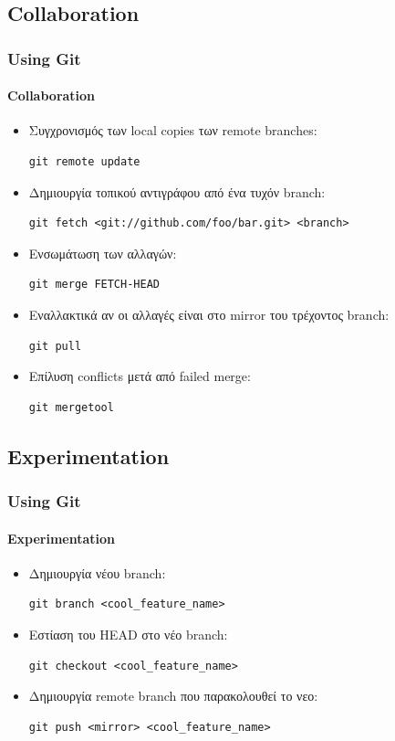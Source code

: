 \documentclass[]{beamer}
\begin{document}
\subsection{Collaboration}

\begin{frame}[fragile]
  \frametitle{Using Git}
  \framesubtitle{Collaboration}
  \begin{itemize}
    \item Συγχρονισμός των local copies των remote branches:
\begin{verbatim}
git remote update
\end{verbatim}
    \item Δημιουργία τοπικού αντιγράφου από ένα τυχόν branch:
\begin{verbatim}
git fetch <git://github.com/foo/bar.git> <branch>
\end{verbatim}
    \item Ενσωμάτωση των αλλαγών:
\begin{verbatim}
git merge FETCH-HEAD
\end{verbatim}
    \item Εναλλακτικά αν οι αλλαγές είναι στο mirror του τρέχοντος branch:
\begin{verbatim}
git pull
\end{verbatim}
    \item Επίλυση conflicts μετά από failed merge:
\begin{verbatim}
git mergetool
\end{verbatim}
  \end{itemize}
\end{frame}

\subsection{Experimentation}

\begin{frame}[fragile]
  \frametitle{Using Git}
  \framesubtitle{Experimentation}
  \begin{itemize}
    \item Δημιουργία νέου branch:
\begin{verbatim}
git branch <cool_feature_name>
\end{verbatim}
    \item Εστίαση του HEAD στο νέο branch:
\begin{verbatim}
git checkout <cool_feature_name>
\end{verbatim}
    \item Δημιουργία remote branch που παρακολουθεί το νεο:
\begin{verbatim}
git push <mirror> <cool_feature_name>
\end{verbatim}
  \end{itemize}
\end{frame}
\end{document}
